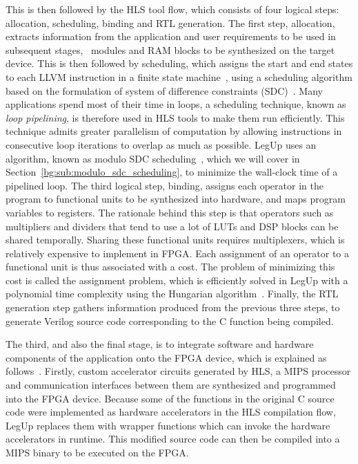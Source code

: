 This is then followed by the HLS tool flow, which consists of four logical
steps: allocation, scheduling, binding and RTL generation.  The first
step, allocation, extracts information from the application and user
requirements to be used in subsequent stages, \eg~modules and RAM blocks to
be synthesized on the target device.  This is then followed by scheduling,
which assigns the start and end states to each LLVM instruction in a
finite state machine~\cite{legup}, using a scheduling algorithm based on
the formulation of system of difference constraints (SDC)~\cite{legup,
canis13, cong06}.  Many applications spend most of their time in loops, a
scheduling technique, known as \emph{loop pipelining}, is therefore used
in HLS tools to make them run efficiently.  This technique admits greater
parallelism of computation by allowing instructions in consecutive loop
iterations to overlap as much as possible.  LegUp uses an algorithm,
known as modulo SDC scheduling~\cite{canis14}, which we will cover in
Section~\ref{bg:sub:modulo_sdc_scheduling}, to minimize the wall-clock time
of a pipelined loop.  The third logical step, binding, assigns each operator
in the program to functional units to be synthesized into hardware, and maps
program variables to registers.  The rationale behind this step is that
operators such as multipliers and dividers that tend to use a lot of LUTs and
DSP blocks can be shared temporally.  Sharing these functional units requires
multiplexers, which is relatively expensive to implement in FPGA\@.  Each
assignment of an operator to a functional unit is thus associated with a cost.
The problem of minimizing this cost is called the assignment problem, which
is efficiently solved in LegUp with a polynomial time complexity using the
Hungarian algorithm~\cite{canis13, kuhn10}.  Finally, the RTL generation step
gathers information produced from the previous three steps, to generate Verilog
source code corresponding to the C function being compiled.

The third, and also the final stage, is to integrate software and hardware
components of the application onto the FPGA device, which is explained as
follows~\cite{canis13}.  Firstly, custom accelerator circuits generated by HLS,
a MIPS processor and communication interfaces between them are synthesized and
programmed into the FPGA device.  Because some of the functions in the original
C source code were implemented as hardware accelerators in the HLS compilation
flow, LegUp replaces them with wrapper functions which can invoke the hardware
accelerators in runtime.  This modified source code can then be compiled into a
MIPS binary to be executed on the FPGA\@.


